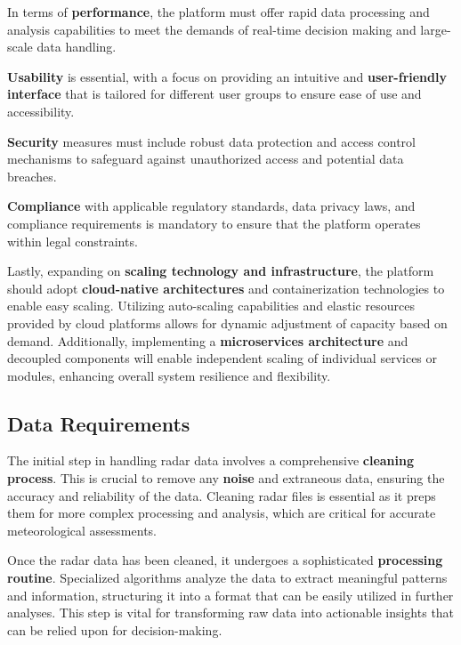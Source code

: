 In terms of \textbf{performance}, the platform must offer rapid data processing
and analysis capabilities to meet the demands of real-time decision making and
large-scale data handling.

\textbf{Usability} is essential, with a focus on providing an intuitive and
\textbf{user-friendly interface} that is tailored for different user groups to
ensure ease of use and accessibility.

\textbf{Security} measures must include robust data protection and access
control mechanisms to safeguard against unauthorized access and potential data
breaches.

\textbf{Compliance} with applicable regulatory standards, data privacy laws, and
compliance requirements is mandatory to ensure that the platform operates within
legal constraints.

Lastly, expanding on \textbf{scaling technology and infrastructure}, the
platform should adopt \textbf{cloud-native architectures} and containerization
technologies to enable easy scaling. Utilizing auto-scaling capabilities and
elastic resources provided by cloud platforms allows for dynamic adjustment of
capacity based on demand. Additionally, implementing a \textbf{microservices
architecture} and decoupled components will enable independent scaling of
individual services or modules, enhancing overall system resilience and
flexibility.

\subsection{Data Requirements}

The initial step in handling radar data involves a comprehensive
\textbf{cleaning process}. This is crucial to remove any \textbf{noise} and
extraneous data, ensuring the accuracy and reliability of the data. Cleaning
radar files is essential as it preps them for more complex processing and
analysis, which are critical for accurate meteorological assessments.

Once the radar data has been cleaned, it undergoes a sophisticated
\textbf{processing routine}. Specialized algorithms analyze the data to extract
meaningful patterns and information, structuring it into a format that can be
easily utilized in further analyses. This step is vital for transforming raw
data into actionable insights that can be relied upon for decision-making.

